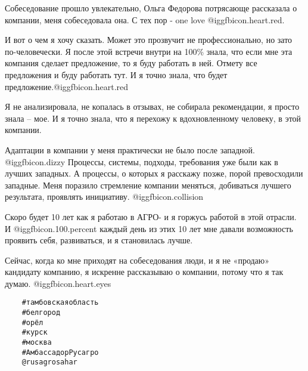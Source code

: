 Собеседование прошло увлекательно, Ольга Федорова потрясающе рассказала о
компании, меня собеседовала она. С тех пор - one love @igg{fbicon.heart.red}.

И вот о чем я хочу сказать. Может это прозвучит не профессионально, но зато
по-человечески. Я после этой встречи внутри на 100\% знала, что если мне эта
компания сделает предложение, то я буду работать в ней. Отмету все предложения
и буду работать тут. И я точно знала, что будет
предложение.@igg{fbicon.heart.red}

Я не анализировала, не копалась в отзывах, не собирала рекомендации, я просто
знала – мое. И я точно знала, что я перехожу к вдохновленному человеку, в этой
компании.

Адаптации в компании у меня практически не было после западной.  @igg{fbicon.dizzy}  Процессы,
системы, подходы, требования уже были как в лучших западных.  А процессы, о
которых я расскажу позже, порой превосходили западные.  Меня поразило
стремление компании меняться, добиваться лучшего результата, проявлять
инициативу.  @igg{fbicon.collision} 

Скоро будет 10 лет как я работаю в АГРО- и я горжусь работой в этой отрасли. И
 @igg{fbicon.100.percent} каждый день из этих 10 лет   мне давали возможность проявить себя,
развиваться, и я становилась лучше.

Сейчас, когда ко мне приходят на собеседования люди, и я не «продаю» кандидату
компанию,  я искренне рассказываю о компании, потому что я так думаю. @igg{fbicon.heart.eyes} 

\begin{verbatim}
	#тамбовскаяобласть 
	#белгород 
	#орёл 
	#курск 
	#москва 
	#АмбассадорРусагро 
	@rusagrosahar
\end{verbatim}
